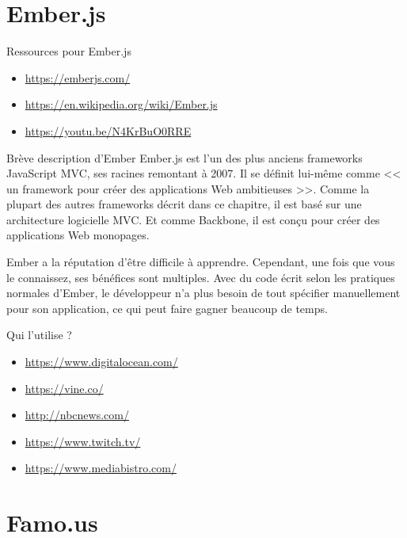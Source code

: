 \documentclass[presentation]{beamer}
\begin{document}
\section{Ember.js}
\label{sec:orga214561}

\begin{frame}[label={sec:orgebfc068}]{Ressources pour Ember.js}
\begin{itemize}
\item \url{https://emberjs.com/}
\item \url{https://en.wikipedia.org/wiki/Ember.js}
\item \url{https://youtu.be/N4KrBuO0RRE}
\end{itemize}
\end{frame}


\begin{frame}[label={sec:org94c5e95}]{Brève description d'Ember}
Ember.js est l'un des plus anciens frameworks JavaScript MVC, ses
racines remontant à 2007. Il se définit lui-même comme << un
framework pour créer des applications Web ambitieuses >>. Comme la
plupart des autres frameworks décrit dans ce chapitre, il est basé
sur une architecture logicielle MVC. Et comme Backbone, il est conçu
pour créer des applications Web monopages.

Ember a la réputation d'être difficile à apprendre. Cependant, une
fois que vous le connaissez, ses bénéfices sont multiples. Avec du
code écrit selon les pratiques normales d'Ember, le développeur n'a
plus besoin de tout spécifier manuellement pour son application, ce
qui peut faire gagner beaucoup de temps.
\end{frame}

\begin{frame}[label={sec:orgbed8848}]{Qui l'utilise ?}
\begin{itemize}
\item \url{https://www.digitalocean.com/}
\item \url{https://vine.co/}
\item \url{http://nbcnews.com/}
\item \url{https://www.twitch.tv/}
\item \url{https://www.mediabistro.com/}
\end{itemize}
\end{frame}


\section{Famo.us}
\label{sec:orgf8248b1}
\end{document}
